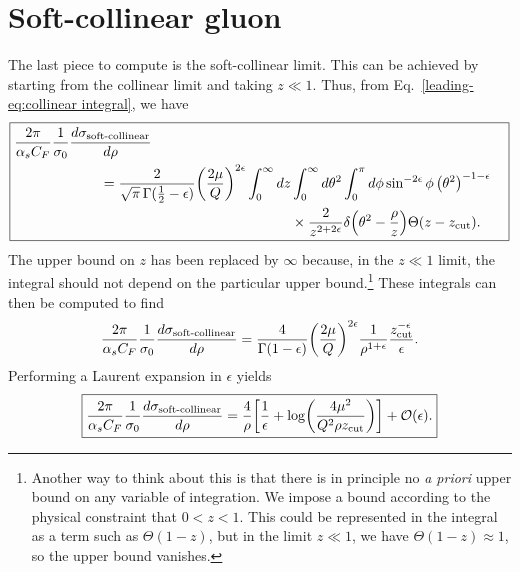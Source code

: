 \documentclass[../thesis.tex]{subfiles}
\providecommand{\zcut}{z_\mathrm{{cut}}}
\providecommand{\cO}{\mathcal{O}}
\begin{document}
\section{Soft-collinear gluon}
	The last piece to compute is the soft-collinear limit. This can be achieved by starting from the collinear limit and taking $z \ll 1$. Thus, from Eq.~\ref{leading-eq:collinear integral}, we have
	\begin{equation}
	\boxed{
	\begin{aligned}
		\frac{2\pi}{\alpha_s C_F} \frac{1}{\sigma_0}\frac{d\sigma_{\text{soft-collinear}}}{d\rho}\hspace{3.5cm} \\
		= \frac{2}{\sqrt{\pi}\,\Gamma(\frac{1}{2} - \epsilon)} \qty(\frac{2\mu}{Q})^{2\epsilon} \int_0^\infty dz &\int_0^\infty d\theta^2 \int_0^{\pi} d\phi \sin^{-2\epsilon}\phi\,\qty(\theta^2)^{-1-\epsilon} \\
			&\times  \frac{2}{z^{2+2\epsilon}} \delta\qty(\theta^2 - \frac{\rho}{z}) \Theta\qty(z - \zcut).
	\end{aligned}
	}
	\end{equation}
	The upper bound on $z$ has been replaced by $\infty$ because, in the $z \ll 1$ limit, the integral should not depend on the particular upper bound.\footnote{Another way to think about this is that there is in principle no \textit{a priori} upper bound on any variable of integration. We impose a bound according to the physical constraint that $0 < z < 1$. This could be represented in the integral as a term such as $\Theta(1 - z)$, but in the limit $z \ll 1$, we have $\Theta(1 - z) \approx 1$, so the upper bound vanishes.} These integrals can then be computed to find
	\begin{equation}
	\begin{aligned}
		\frac{2\pi}{\alpha_s C_F} \frac{1}{\sigma_0}\frac{d\sigma_{\text{soft-collinear}}}{d\rho} = \frac{4}{\Gamma(1 - \epsilon)} \qty(\frac{2\mu}{Q})^{2\epsilon} \frac{1}{\rho^{1+\epsilon}} \frac{\zcut^{-\epsilon}}{\epsilon}.
	\end{aligned}
	\end{equation}
	Performing a Laurent expansion in $\epsilon$ yields
	\begin{equation}\label{leading-eq:soft-collinear result}
	\boxed{
		\frac{2\pi}{\alpha_s C_F} \frac{1}{\sigma_0}\frac{d\sigma_{\text{soft-collinear}}}{d\rho} = \frac{4}{\rho}\qty[\frac{1}{\epsilon} + \log(\frac{4\mu^2}{Q^2 \rho \zcut})] + \cO(\epsilon).
	}
	\end{equation}
\end{document}
